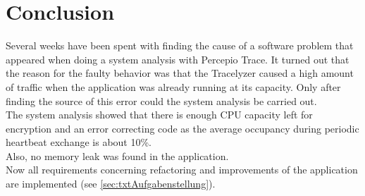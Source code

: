 \section{Conclusion}
Several weeks have been spent with finding the cause of a software problem that appeared when doing a system analysis with Percepio Trace. It turned out that the reason for the faulty behavior was that the Tracelyzer caused a high amount of traffic when the application was already running at its capacity. Only after finding the source of this error could the system analysis be carried out.\\
The system analysis showed that there is enough CPU capacity left for encryption and an error correcting code as the average occupancy during periodic heartbeat exchange is about 10\%.\\
Also, no memory leak was found in the application.\\
Now all requirements concerning refactoring and improvements of the application are implemented (see \autoref{sec:txtAufgabenstellung}).